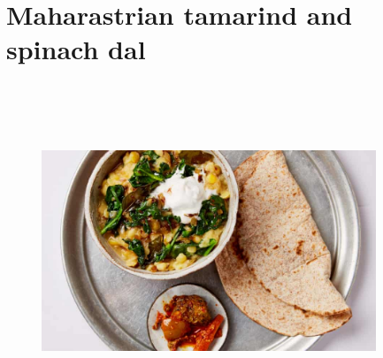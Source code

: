 \documentclass{book}
\begin{document}
\section{Maharastrian tamarind and spinach dal}
\begin{figure}
\centering\includegraphics[width=10cm,height=10cm,keepaspectratio]{Recipe_Pictures/Maharastrian_tamarind_and_spinach_dal.png}
\end{figure}
\end{document}
